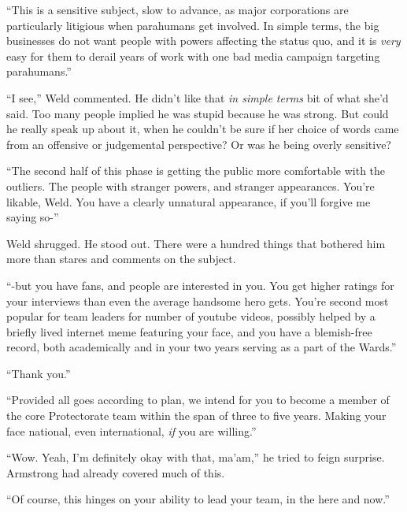 ``This is a sensitive subject, slow to advance, as major corporations are particularly litigious when parahumans get involved.  In simple terms, the big businesses do not want people with powers affecting the status quo, and it is \emph{very} easy for them to derail years of work with one bad media campaign targeting parahumans.''



``I see,'' Weld commented.  He didn't like that \emph{in simple terms} bit of what she'd said.  Too many people implied he was stupid because he was strong.  But could he really speak up about it, when he couldn't be sure if her choice of words came from an offensive or judgemental perspective?  Or was he being overly sensitive?



``The second half of this phase is getting the public more comfortable with the outliers.  The people with stranger powers, and stranger appearances.  You're likable, Weld.  You have a clearly unnatural appearance, if you'll forgive me saying so-''



Weld shrugged.  He stood out.  There were a hundred things that bothered him more than stares and comments on the subject.



``-but you have fans, and people are interested in you.  You get higher ratings for your interviews than even the average handsome hero gets.  You're second most popular for team leaders for number of youtube videos, possibly helped by a briefly lived internet meme featuring your face, and you have a blemish-free record, both academically and in your two years serving as a part of the Wards.''



``Thank you.''



``Provided all goes according to plan, we intend for you to become a member of the core Protectorate team within the span of three to five years.  Making your face national, even international,\emph{ if} you are willing.''



``Wow.  Yeah, I'm definitely okay with that, ma'am,'' he tried to feign surprise.  Armstrong had already covered much of this.



``Of course, this hinges on your ability to lead your team, in the here and now.''



